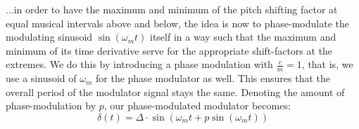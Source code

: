 ...in order to have the maximum and minimum of the pitch shifting factor at equal musical intervals above and below, the idea is now to phase-modulate the modulating sinusoid $\sin(\omega_m t)$ itself in a way such that the maximum and minimum of its time derivative serve for the appropriate shift-factors at the extremes. We do this by introducing a phase modulation with $\frac{c}{m}=1$, that is, we use a sinusoid of $\omega_m$ for the phase modulator as well. This ensures that the overall period of the modulator signal stays the same. Denoting the amount of phase-modulation by $p$, our phase-modulated modulator becomes:
\begin{equation}
 \delta(t) = \Delta \cdot \sin(\omega_m t + p \sin(\omega_m t) )
\end{equation}








